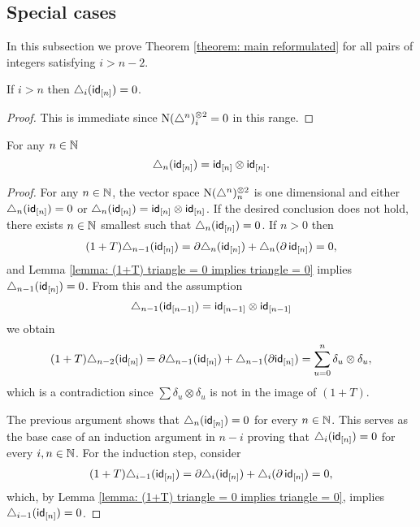 \subsection{Special cases}

In this subsection we prove Theorem \ref{theorem: main reformulated} for all pairs of integers satisfying $i > n-2$.

\begin{lemma}
	If $i > n$ then $\triangle_i(\mathsf{id}_{[n]}) = 0$.
\end{lemma}

\begin{proof}
	This is immediate since $\operatorname{N}(\triangle^n)^{\otimes 2}_i = 0$ in this range.
\end{proof}

\begin{lemma} \label{lemma: triangle_n of n = n x n}
    For any $n \in \mathbb{N}$
    \[
    \triangle_n(\mathsf{id}_{[n]}) = \mathsf{id}_{[n]} \otimes \mathsf{id}_{[n]}.
    \]
\end{lemma}

\begin{proof}
	For any $n \in \mathbb{N}$, the vector space $\operatorname{N}(\triangle^n)^{\otimes 2}_n$ is one dimensional and either $\triangle_n(\mathsf{id}_{[n]}) = 0$ or $\triangle_n(\mathsf{id}_{[n]}) = \mathsf{id}_{[n]} \otimes \mathsf{id}_{[n]}$. If the desired conclusion does not hold, there exists $n \in \mathbb{N}$ smallest such that $\triangle_n (\mathsf{id}_{[n]}) = 0$. If $n > 0$ then
    \begin{align*}
    (1 + T) \triangle_{n-1}(\mathsf{id}_{[n]}) =
    \partial \triangle_{n}(\mathsf{id}_{[n]}) + \triangle_{n}(\partial\, \mathsf{id}_{[n]}) =
    0,
    \end{align*}
    and Lemma \ref{lemma: (1+T) triangle = 0 implies triangle = 0} implies $\triangle_{n-1}(\mathsf{id}_{[n]}) = 0$. From this and the assumption
    \[
    \triangle_{n-1} (\mathsf{id}_{[n-1]}) = \mathsf{id}_{[n-1]} \otimes \mathsf{id}_{[n-1]}
    \]
    we obtain
    \begin{equation}
    \begin{split}
    (1+T)\triangle_{n-2}(\mathsf{id}_{[n]}) =
    \partial \triangle_{n-1}(\mathsf{id}_{[n]}) + \triangle_{n-1}(\partial \mathsf{id}_{[n]}) =
    \sum_{u = 0}^n \delta_u \otimes \delta_u,
    \end{split}
    \end{equation}
 	which is a contradiction since $\sum \delta_u \otimes \delta_u$ is not in the image of $(1+T)$.

    The previous argument shows that $\triangle_n(\mathsf{id}_{[n]}) = 0$ for every $n \in \mathbb{N}$. This serves as the base case of an induction argument in $n-i$ proving that $\triangle_i(\mathsf{id}_{[n]}) = 0$ for every $i, n \in \mathbb{N}$. For the induction step, consider
    \begin{align*}
    (1+T) \triangle_{i-1}(\mathsf{id}_{[n]}) =
    \partial \triangle_{i}(\mathsf{id}_{[n]}) + \triangle_{i}(\partial\, \mathsf{id}_{[n]}) =
    0,
    \end{align*}
    which, by Lemma \ref{lemma: (1+T) triangle = 0 implies triangle = 0}, implies $\triangle_{i-1} (\mathsf{id}_{[n]}) = 0$.
\end{proof}

